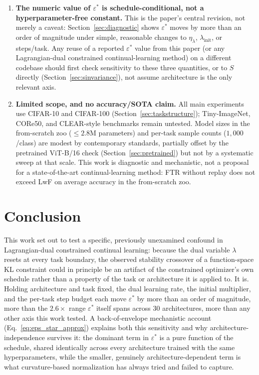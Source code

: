 \documentclass[11pt]{article}
\newcommand{\eps}{\varepsilon}
\newcommand{\epsstar}{\eps^{*}}
\begin{document}
\begin{enumerate}
\item \textbf{The numeric value of $\epsstar$ is schedule-conditional, not
a hyperparameter-free constant.} This is the paper's central revision, not
merely a caveat: Section~\ref{sec:diagnostic} shows $\epsstar$ moves by more
than an order of magnitude under simple, reasonable changes to
$\eta_\lambda$, $\lambda_{\mathrm{init}}$, or steps/task. Any reuse of a
reported $\epsstar$ value from this paper (or any Lagrangian-dual
constrained continual-learning method) on a different codebase should first
check sensitivity to these three quantities, or to $S$ directly
(Section~\ref{sec:sinvariance}), not assume architecture is the only
relevant axis.
\item \textbf{Limited scope, and no accuracy/SOTA claim.} All main
experiments use CIFAR-10 and CIFAR-100 (Section~\ref{sec:taskstructure});
Tiny-ImageNet, CORe50, and CLEAR-style benchmarks remain untested. Model
sizes in the from-scratch zoo ($\le2.8$M parameters) and per-task sample
counts ($1{,}000$/class) are modest by contemporary standards, partially
offset by the pretrained ViT-B/16 check (Section~\ref{sec:pretrained}) but
not by a systematic sweep at that scale. This work is diagnostic and
mechanistic, not a proposal for a state-of-the-art continual-learning
method: FTR without replay does not exceed LwF on average accuracy in the
from-scratch zoo.
\end{enumerate}

\section{Conclusion}
\label{sec:conclusion}

This work set out to test a specific, previously unexamined confound in
Lagrangian-dual constrained continual learning: because the dual variable
$\lambda$ resets at every task boundary, the observed stability crossover of
a function-space KL constraint could in principle be an artifact of the
constrained optimizer's own schedule rather than a property of the task or
architecture it is applied to. It is. Holding architecture and task fixed,
the dual learning rate, the initial multiplier, and the per-task step
budget each move $\epsstar$ by more than an order of magnitude, more than
the $2.6\times$ range $\epsstar$ itself spans across 30 architectures,
more than any other axis this work tested. A back-of-envelope mechanistic account
(Eq.~\ref{eq:eps_star_approx}) explains both this sensitivity and why
architecture-independence survives it: the dominant term in $\epsstar$ is a
pure function of the schedule, shared identically across every
architecture trained with the same hyperparameters, while the smaller,
genuinely architecture-dependent term is what curvature-based normalization
has always tried and failed to capture.
\end{document}
